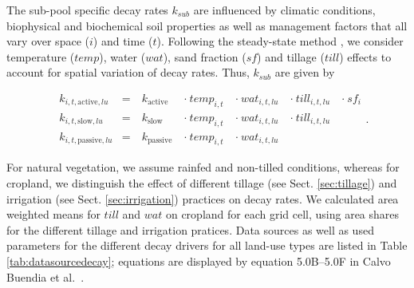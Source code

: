 \documentclass[gc, manuscript]{copernicus}
\begin{document}
The sub-pool specific decay rates \(k_{sub}\) are influenced by climatic conditions, biophysical and biochemical soil properties as well as management factors that all vary over space (\(i\)) and time (\(t\)). Following the steady-state method \citep{calvo_buendia_ipcc_2019}, we consider temperature (\(temp\)), water (\(wat\)), sand fraction (\(sf\)) and tillage (\(till\)) effects to account for spatial variation of decay rates. Thus, \(k_{sub}\) are given by

\begin{equation}
\begin{aligned}
& k_{i,t,\mathrm{active},lu}  & = &~ k_{\mathrm{active}}  ~ &\cdot~ temp_{i,t} ~ &\cdot~ wat_{i,t,lu} ~ &\cdot~ till_{i,t,lu} ~ & \cdot~ sf_{i}\\
& k_{i,t,\mathrm{slow},lu}    & = &~ k_{\mathrm{slow}}    ~ &\cdot~ temp_{i,t} ~ &\cdot~ wat_{i,t,lu} ~ &\cdot~ till_{i,t,lu} ~ &\\
& k_{i,t,\mathrm{passive},lu} & = &~ k_{\mathrm{passive}} ~ &\cdot~ temp_{i,t} ~ &\cdot~ wat_{i,t,lu} ~ & ~ & 
\label{eq:decayrates}
\end{aligned}.
\end{equation}

For natural vegetation, we assume rainfed and non-tilled conditions, whereas for cropland, we distinguish the effect of different tillage (see Sect. \ref{sec:tillage}) and irrigation (see Sect. \ref{sec:irrigation}) practices on decay rates. We calculated area weighted means for \(till\) and \(wat\) on cropland for each grid cell, using area shares for the different tillage and irrigation pratices. Data sources as well as used parameters for the different decay drivers for all land-use types are listed in Table \ref{tab:datasourcedecay}; equations are displayed by equation 5.0B--5.0F in Calvo Buendia et al.~\citeyearpar{calvo_buendia_ipcc_2019}.
\end{document}
